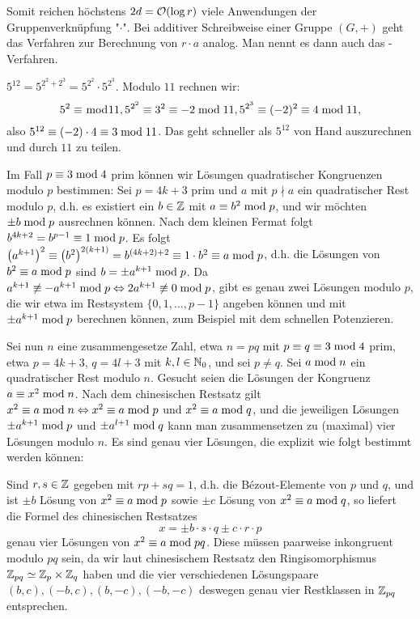 Somit reichen höchstens $2d = \mathcal{O}(\log r)$ viele Anwendungen der Gruppenverknüpfung "$\cdot$". 
Bei additiver Schreibweise einer Gruppe $(G,+)$ geht das Verfahren zur Berechnung von $r \cdot a$ analog. 
Man nennt es dann auch das -Verfahren.

\begin{bsp}
	$5^{12} = 5^{2^2+2^3} = 5^{2^2} \cdot 5^{2^3}$. Modulo $11$ rechnen wir:
	\[5^2 \equiv  \bmod 11, 5^{2^2} \equiv 3^2 \equiv -2 \bmod 11, 5^{2^3} \equiv (-2)^2 \equiv 4 \bmod 11, \]
	also $5^{12} \equiv (-2) \cdot 4 \equiv 3 \bmod 11$. 
	Das geht schneller als $5^{12}$ von Hand auszurechnen und durch $11$ zu teilen.
\end{bsp}

\begin{anw}
	Im Fall $p \equiv 3 \bmod 4$ prim können wir Lösungen quadratischer Kongruenzen modulo $p$ bestimmen: Sei $p = 4k+3$ prim und $a$ mit $p \nmid a$ ein quadratischer Rest modulo $p$, d.h. es existiert ein $b \in \mathbb{Z}$ mit $a \equiv b^2 \bmod p$, und wir möchten $\pm b \bmod p$ ausrechnen können. 
	Nach dem kleinen Fermat folgt $b^{4k+2} = b^{p-1} \equiv 1 \bmod p$. 
	Es folgt $\left(a^{k+1}\right)^2 \equiv \left(b^2\right)^{2(k+1)} = b^{(4k+2)+2} \equiv 1 \cdot b^2 \equiv a \bmod p$, d.h. die Lösungen von $b^2 \equiv a \bmod p$ sind $b = \pm a^{k+1} \bmod p$. 
	Da $a^{k+1} \not\equiv -a^{k+1} \bmod p \Leftrightarrow 2a^{k+1} \not\equiv 0 \bmod p$, gibt es genau zwei Lösungen modulo $p$, die wir etwa im Restsystem $\{0,1,\dots,p-1\}$ angeben können und mit $\pm a^{k+1} \bmod p$ berechnen können, zum Beispiel mit dem schnellen Potenzieren.
\end{anw}

\begin{anw}
\label{anw_1.1.3.14}
	Sei nun $n$ eine zusammengesetze Zahl, etwa $n = pq$ mit $p \equiv q \equiv 3 \bmod 4$ prim, etwa $p = 4k+3$, $q = 4l+3$ mit $k,l \in \mathbb{N}_0$, und sei $p \neq q$. 
	Sei $a \bmod n$ ein quadratischer Rest modulo $n$. 
	Gesucht seien die Lösungen der Kongruenz $a \equiv x^2 \bmod n$. 
	Nach dem chinesischen Restsatz gilt $x^2 \equiv a \bmod n \Leftrightarrow x^2 \equiv a \bmod p$ und $x^2 \equiv a \bmod q$, und die jeweiligen Lösungen $\pm a^{k+1} \bmod p$ und $\pm a^{l+1} \bmod q$ kann man zusammensetzen zu (maximal) vier Lösungen modulo $n$. 
	Es sind genau vier Lösungen, die explizit wie folgt bestimmt werden können:
	
	Sind $r,s \in \mathbb{Z}$ gegeben mit $rp + sq = 1$, d.h. die Bézout-Elemente von $p$ und $q$, und ist $\pm b$ Lösung von $x^2 \equiv a \bmod p$ sowie $\pm c$ Lösung von $x^2 \equiv a \bmod q$, so liefert die Formel des chinesischen Restsatzes
	\[ x = \pm b\cdot s \cdot q \pm c \cdot r \cdot p \]
	genau vier Lösungen von $x^2 \equiv a \bmod pq$. 
	Diese müssen paarweise inkongruent modulo $pq$ sein, da wir laut chinesischem Restsatz den Ringisomorphismus $\mathbb{Z}_{pq} \simeq \mathbb{Z}_p \times \mathbb{Z}_q$ haben und die vier verschiedenen Lösungspaare $(b,c), (-b,c), (b,-c), (-b,-c)$ deswegen genau vier Restklassen in $\mathbb{Z}_{pq}$ entsprechen.
\end{anw}


